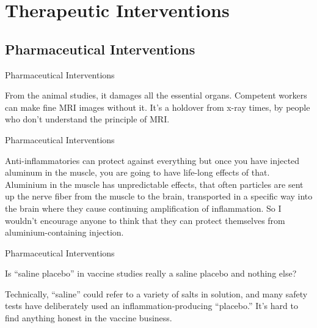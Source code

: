 \documentclass[11pt,oneside,openany,extrafontsizes]{memoir}
\begin{document}
\chapter{Therapeutic Interventions}

\section{Pharmaceutical Interventions}

\begin{standalonequote}{Pharmaceutical Interventions}

    \begin{answer}
       From the animal studies, it damages all the essential organs. Competent workers can make fine MRI images without it. It's a holdover from x-ray times, by people who don't understand the principle of MRI. 
    \end{answer}
\end{standalonequote}

\begin{standalonequote}{Pharmaceutical Interventions}

    \begin{answer}
      Anti-inflammatories can protect against everything but once you have injected aluminum in the muscle, you are going to have life-long effects of that. Aluminium in the muscle has unpredictable effects, that often particles are sent up the nerve fiber from the muscle to the brain, transported in a specific way into the brain where they cause continuing amplification of inflammation. So I wouldn't encourage anyone to think that they can protect themselves from aluminium-containing injection.
    \end{answer}
\end{standalonequote}

\begin{qaexchange}{Pharmaceutical Interventions}

    \begin{question}
        Is \enquote{saline placebo} in vaccine studies really a saline placebo and nothing else?
    \end{question}

    \begin{answer}
      Technically, \enquote{saline} could refer to a variety of salts in solution, and many safety tests have deliberately used an inflammation-producing \enquote{placebo.} It's hard to find anything honest in the vaccine business.
    \end{answer}
\end{qaexchange}
\end{document}
